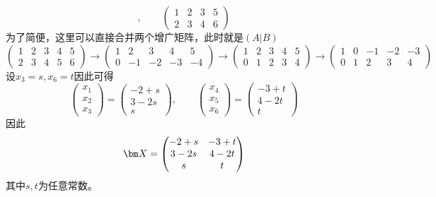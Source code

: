 \begin{solution}
\[            ,\qquad
            \left(\begin{array}{ccc|c}
                    1 & 2 & 3 & 5 \\
                    2 & 3 & 4 & 6
                \end{array}\right)
        \]
        为了简便，这里可以直接合并两个增广矩阵，此时就是$(A|B)$
        \[
            \left(\begin{array}{ccc|cc}
                    1 & 2 & 3 & 4 & 5 \\
                    2 & 3 & 4 & 5 & 6
                \end{array}\right)
            \longrightarrow
            \left(\begin{array}{ccc|cc}
                    1 & 2  & 3  & 4  & 5  \\
                    0 & -1 & -2 & -3 & -4
                \end{array}\right)
            \longrightarrow
            \left(\begin{array}{ccc|cc}
                    1 & 2 & 3 & 4 & 5 \\
                    0 & 1 & 2 & 3 & 4
                \end{array}\right)
            \longrightarrow
            \left(\begin{array}{ccc|cc}
                    1 & 0 & -1 & -2 & -3 \\
                    0 & 1 & 2  & 3  & 4
                \end{array}\right)
        \]
        设$x_3=s,x_6=t$因此可得
        \[
            \begin{pmatrix}
                x_1 \\ x_2 \\ x_3
            \end{pmatrix}
            =
            \begin{pmatrix}
                -2+s \\ 3-2s \\ s
            \end{pmatrix}
            ,\qquad
            \begin{pmatrix}
                x_4 \\ x_5 \\ x_6
            \end{pmatrix}
            =
            \begin{pmatrix}
                -3+t \\ 4-2t \\ t
            \end{pmatrix}
        \]
        因此
        \[
            \mat{X} =
            \begin{pmatrix}
                -2+s & -3+t \\
                3-2s & 4-2t \\
                s    & t
            \end{pmatrix}
        \]
        其中$s,t$为任意常数。
\end{solution}
